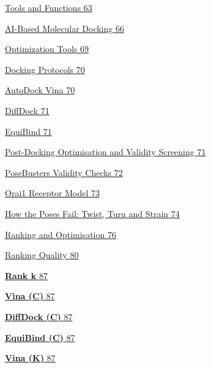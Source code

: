 \protect\hyperlink{tools-and-functions}{Tools and Functions \protect\hyperlink{tools-and-functions}{63}}

\protect\hyperlink{ai-based-molecular-docking-1}{AI-Based Molecular Docking \protect\hyperlink{ai-based-molecular-docking-1}{66}}

\protect\hyperlink{optimization-tools-1}{Optimization Tools \protect\hyperlink{optimization-tools-1}{69}}

\protect\hyperlink{docking-protocols}{Docking Protocols \protect\hyperlink{docking-protocols}{70}}

\protect\hyperlink{autodock-vina-2}{AutoDock Vina \protect\hyperlink{autodock-vina-2}{70}}

\protect\hyperlink{diffdock-2}{DiffDock \protect\hyperlink{diffdock-2}{71}}

\protect\hyperlink{equibind-2}{EquiBind \protect\hyperlink{equibind-2}{71}}

\protect\hyperlink{post-docking-optimisation-and-validity-screening}{Post-Docking Optimisation and Validity Screening \protect\hyperlink{post-docking-optimisation-and-validity-screening}{71}}

\protect\hyperlink{posebusters-validity-checks}{PoseBusters Validity Checks \protect\hyperlink{posebusters-validity-checks}{72}}

\protect\hyperlink{orai1-receptor-model}{Orai1 Receptor Model \protect\hyperlink{orai1-receptor-model}{73}}

\protect\hyperlink{_Toc235735956}{How the Poses Fail: Twist, Turn and Strain \protect\hyperlink{_Toc235735956}{74}}

\protect\hyperlink{ranking-and-optimisation}{Ranking and Optimisation \protect\hyperlink{ranking-and-optimisation}{76}}

\protect\hyperlink{ranking-quality}{Ranking Quality \protect\hyperlink{ranking-quality}{80}}

\protect\hyperlink{_Toc235735959}{\textbf{Rank k} \protect\hyperlink{_Toc235735959}{87}}

\protect\hyperlink{_Toc235735960}{\textbf{Vina (C)} \protect\hyperlink{_Toc235735960}{87}}

\protect\hyperlink{_Toc235735961}{\textbf{DiffDock (C)} \protect\hyperlink{_Toc235735961}{87}}

\protect\hyperlink{_Toc235735962}{\textbf{EquiBind (C)} \protect\hyperlink{_Toc235735962}{87}}

\protect\hyperlink{_Toc235735963}{\textbf{Vina (K)} \protect\hyperlink{_Toc235735963}{87}}

